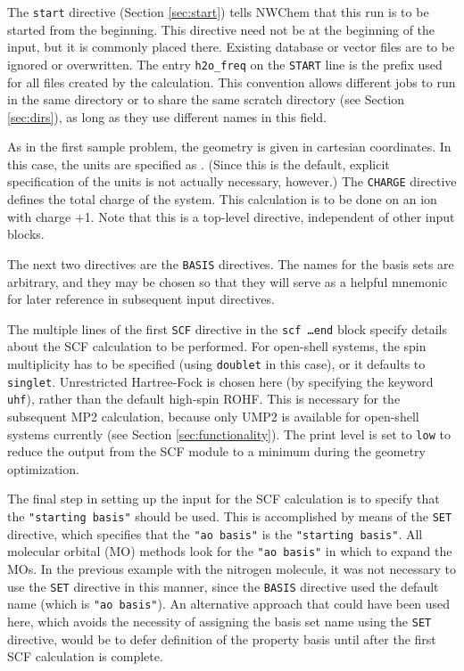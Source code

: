 The {\tt start} directive (Section \ref{sec:start}) tells NWChem that
this run is to be started from the beginning.  This directive need not
be at the beginning of the input, but it is commonly placed there.
Existing database or vector files are to be ignored or overwritten.
The entry \verb+h2o_freq+ on the \verb+START+ line is the prefix used
for all files created by the calculation.  This convention allows
different jobs to run in the same directory or to share the same
scratch directory (see Section \ref{sec:dirs}), as long as they use
different names in this field.

As in the first sample problem, the geometry is given in cartesian
coordinates.  In this case, the units are specified as
{\angstroms}.  (Since this is the default, explicit specification of the
units is not actually necessary, however.)  The {\tt CHARGE}
directive defines the total charge of the system.  This calculation is
to be done on an ion with charge +1.  Note that this is a top-level
directive, independent of other input blocks.

The next two directives are the {\tt BASIS} directives.  The names for
the basis sets are arbitrary, and they may be chosen so that they will
serve as a helpful mnemonic for later reference in subsequent input
directives.

The multiple lines of the first {\tt SCF} directive in the {\tt scf
  \ldots end} block specify details about the SCF calculation to be
performed.  For open-shell systems, the spin multiplicity has to be
specified (using {\tt doublet} in this case), or it defaults to {\tt
  singlet}.  Unrestricted Hartree-Fock is chosen here (by specifying
the keyword {\tt uhf}), rather than the default high-spin ROHF.  This
is necessary for the subsequent MP2 calculation, because only UMP2 is
available for open-shell systems currently (see Section
\ref{sec:functionality}).  The print level is set to {\tt low} to
reduce the output from the SCF module to a minimum during the geometry
optimization.

The final step in setting up the input for the SCF calculation is to
specify that the \verb+"starting basis"+ should be used.  This is
accomplished by means of the \verb+SET+ directive, which specifies that 
the \verb+"ao basis"+ is the \verb+"starting basis"+.  All molecular
orbital (MO) methods look for the \verb+"ao basis"+ in which to expand the
MOs.    In the previous example with the nitrogen molecule, it was not 
necessary to use the \verb+SET+ directive in this manner, since the 
\verb+BASIS+ directive used the default name (which is \verb+"ao basis"+).
An alternative approach that could have been used here, which avoids the 
necessity of assigning the basis set name using the
\verb+SET+ directive, would be to defer definition of the property basis
until after the first SCF calculation is complete. 

